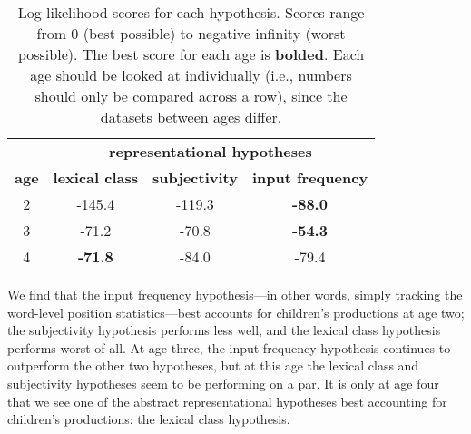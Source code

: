 \documentclass[10pt]{article}
\newcommand{\lsp}[1]{\textcolor{violet}{[lsp: #1]}}
\begin{document}
\begin{table}[!ht]
\begin{center}
\begin{tabular}{ |c|c|c|c| }
\hline
\multicolumn{1}{|c}{} &
\multicolumn{3}{|c|}{\textbf{representational hypotheses}} \\
 \cline{2-4}%
 \textbf{age} & \textbf{lexical class} & \textbf{subjectivity} & \textbf{input frequency}  \\ 
 \hline\hline
 2  & -145.4 & -119.3 & \textbf{-88.0} \\
 \hline
 3  & -71.2 & -70.8 & \textbf{-54.3} \\
 \hline
 4  & \textbf{-71.8} & -84.0 & -79.4 \\
 \hline
\end{tabular}
\end{center}
\vspace{-5mm} %
\caption{Log likelihood scores for each hypothesis. Scores range from 0 (best possible) to negative infinity (worst possible). The best score for each age is \textbf{bolded}. Each age should be looked at individually (i.e., numbers should only be compared across a row), since the datasets between ages differ.}
\label{tab:loglikelihoodscores}
\end{table}

We find that the input frequency hypothesis---in other words, simply tracking the word-level position statistics---best accounts for children's productions at age two; the subjectivity hypothesis performs less well, and the lexical class hypothesis performs worst of all. At age three, the input frequency hypothesis continues to outperform the other two hypotheses, but at this age the lexical class and subjectivity hypotheses seem to be performing on a par. It is only at age four that we see one of the abstract representational hypotheses best accounting for children's productions: the lexical class hypothesis. %
\end{document}
